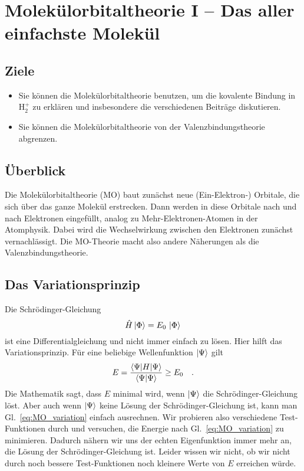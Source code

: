 \renewcommand{\chapterauthors}{Markus Lippitz}
\renewcommand{\lastmod}{21. Oktober 2021}

\chapter{Molekülorbitaltheorie I -- Das aller einfachste Molekül}




\section{Ziele}

\begin{itemize}
\item Sie können die Molekülorbitaltheorie benutzen, um die kovalente Bindung in H$_2^+$ zu erklären und insbesondere die verschiedenen Beiträge  diskutieren.

\item Sie können die Molekülorbitaltheorie von der Valenzbindungstheorie abgrenzen.


\end{itemize}

\section{Überblick}

Die Molekülorbitaltheorie  (MO) baut zunächst neue (Ein-Elektron-) Orbitale, die sich über das ganze Molekül erstrecken. Dann werden in diese Orbitale nach und nach Elektronen eingefüllt, analog zu Mehr-Elektronen-Atomen in der Atomphysik. Dabei wird die Wechselwirkung zwischen den Elektronen zunächst vernachlässigt. Die MO-Theorie macht also andere Näherungen als die Valenzbindungstheorie.

 
 
\section{Das Variationsprinzip}

 
Die Schrödinger-Gleichung
\begin{equation}
 \hat{H} \ket{\Phi} = E_0 \, \ket{\Phi} 
\end{equation}
ist eine Differentialgleichung und nicht immer einfach zu lösen. Hier hilft das Variationsprinzip. Für eine beliebige Wellenfunktion  $\ket{\Psi}$ gilt
\begin{equation}
 E = \frac{\braket{\Psi | H | \Psi}} {\braket{\Psi | \Psi}} \ge E_0 \quad .
 \label{eq:MO_variation}
\end{equation}
Die Mathematik sagt, dass $E$ minimal wird, wenn  $\ket{\Psi}$ die Schrödinger-Gleichung löst. Aber auch wenn $\ket{\Psi}$ keine Lösung der Schrödinger-Gleichung  ist, kann man Gl.~\ref{eq:MO_variation} einfach ausrechnen. Wir probieren  also verschiedene Test-Funktionen durch und versuchen, die Energie nach Gl.~\ref{eq:MO_variation} zu minimieren. Dadurch nähern wir uns der echten Eigenfunktion immer mehr an, die Lösung der Schrödinger-Gleichung ist. Leider wissen wir nicht, ob wir  nicht durch noch bessere Test-Funktionen noch kleinere Werte von $E$ erreichen würde.

